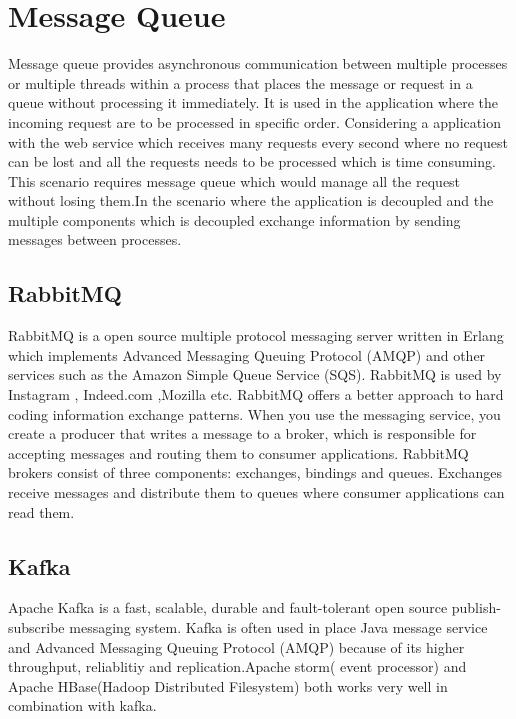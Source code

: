 \section{Message Queue}

  Message queue provides asynchronous communication between multiple processes or multiple threads within a process that places the message or request in a queue without processing it immediately. It is used in the application where the incoming request are to be processed in specific order. Considering a application with the web service which receives many requests every second where no request can be lost and all the requests needs to be processed which is time consuming. This scenario requires message queue which would  manage all the request without losing them.In the scenario where the application is decoupled and the multiple components which is decoupled exchange information by sending messages between processes.

\subsection{RabbitMQ}
			
			RabbitMQ is a open source multiple protocol messaging server written in Erlang which implements Advanced Messaging Queuing Protocol (AMQP) and other services such as the Amazon Simple Queue Service (SQS). RabbitMQ is used  by Instagram , Indeed.com ,Mozilla etc. RabbitMQ offers a better approach to hard coding information exchange patterns. When you use the messaging service, you create a producer that writes a message to a broker, which is responsible for accepting messages and routing them to consumer applications.  RabbitMQ brokers consist of three components: exchanges, bindings and queues.  Exchanges receive messages and distribute them to queues where consumer applications can read them. 
			
\subsection{Kafka}
				
				Apache Kafka is a fast, scalable, durable and fault-tolerant open source publish-subscribe messaging system. Kafka is often used in place Java message service and  Advanced Messaging Queuing Protocol (AMQP) because of its higher throughput, reliablitiy and replication.Apache storm( event processor) and Apache HBase(Hadoop Distributed Filesystem) both works very well in combination with kafka.
							

